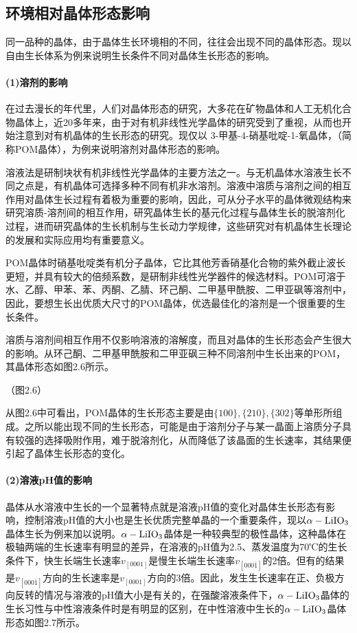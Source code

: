 \subsection{环境相对晶体形态影响}
同一品种的晶体，由于晶体生长环境相的不同，往往会出现不同的晶体形态。现以自由生长体系为例来说明生长条件不同对晶体生长形态的影响。

\paragraph{(1)溶剂的影响}在过去漫长的年代里，人们对晶体形态的研究，大多花在矿物晶体和人工无机化合物晶体上，近20多年来，由于对有机非线性光学晶体的研究受到了重视，从而也开始注意到对有机晶体的生长形态的研究。现仅以{\CJKsetecglue{} 3-甲基-4-硝基吡啶-1-氧}晶体，（简称POM晶体），为例来说明溶剂对晶体形态的影响。

溶液法是研制块状有机非线性光学晶体的主要方法之一。与无机晶体水溶液生长不同之点是，有机晶体可选择多种不同有机非水溶剂。溶液中溶质与溶剂之间的相互作用对晶体生长过程有着极为重要的影响，因此，可从分子水平的晶体微观结构来研究{\CJKsetecglue{}溶质-溶剂}间的相互作用，研究晶体生长的基元化过程与晶体生长的脱溶剂化过程，进而研究晶体的生长机制与生长动力学规律，这些研究对有机晶体生长理论的发展和实际应用均有重要意义。

POM晶体时硝基吡啶类有机分子晶体，它比其他芳香硝基化合物的紫外截止波长更短，并具有较大的倍频系数，是研制非线性光学器件的候选材料。POM可溶于水、乙醇、甲苯、苯、丙酮、乙腈、环己酮、二甲基甲酰胺、二甲亚砜等溶剂中，因此，要想生长出优质大尺寸的POM晶体，优选最佳化的溶剂是一个很重要的生长条件。

溶质与溶剂间相互作用不仅影响溶液的溶解度，而且对晶体的生长形态会产生很大的影响。从环己酮、二甲基甲酰胺和二甲亚砜三种不同溶剂中生长出来的POM，其晶体形态如图2.6所示。

（图2.6）

从图2.6中可看出，POM晶体的生长形态主要是由$\{100\},\{210\},\{302\}$等单形所组成。之所以能出现不同的生长形态，可能是由于溶剂分子与某一晶面上溶质分子具有较强的选择吸附作用，难于脱溶剂化，从而降低了该晶面的生长速率，其结果便引起了晶体生长形态的变化。

\paragraph{(2)溶液pH值的影响}晶体从水溶液中生长的一个显著特点就是溶液pH值的变化对晶体生长形态有影响，控制溶液pH值的大小也是生长优质完整单晶的一个重要条件，现以$\rm\alpha-LiIO_3$晶体生长为例来加以说明。$\rm\alpha-LiIO_3$晶体是一种较典型的极性晶体，这种晶体在极轴两端的生长速率有明显的差异，在溶液的pH值为2.5、蒸发温度为70℃的生长条件下，快生长端生长速率$v_{[0001]}$是慢生长端生长速率$v_{[000\bar{1}]}$的2倍。但有的结果是$v_{[000\bar{1}]}$方向的生长速率是$v_{[0001]}$方向的3倍。因此，发生生长速率在正、负极方向反转的情况与溶液的pH值大小是有关的，在强酸溶液条件下，$\rm\alpha-LiIO_3$晶体的生长习性与中性溶液条件时是有明显的区别，在中性溶液中生长的$\rm\alpha-LiIO_3$晶体形态如图2.7所示。

